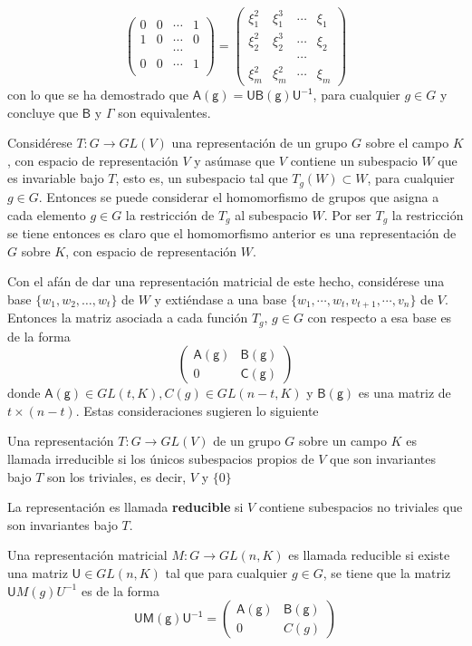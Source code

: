 \begin{ejemplo}
\[\begin{pmatrix}
0 & 0 & \cdots & 1 \\
1 & 0 & \cdots & 0 \\
 & & \cdots & \\
0 & 0 & \cdots & 1 \\
\end{pmatrix} = \begin{pmatrix}
\xi_1^2 & \xi_1^3 & \cdots & \xi_1 \\
\xi_2^2 & \xi_2^3 & \cdots & \xi_2 \\
 & & \cdots & \\
\xi_m^2 & \xi_m^2 & \cdots & \xi_m
\end{pmatrix}
\] con lo que se ha demostrado que $\mathsf{A(g)} = \mathsf{UB(g)U^{-1}}$, para cualquier $g \in G$ y concluye que $\mathsf{B}$ y $\mathsf{\Gamma}$ son equivalentes. 
\end{ejemplo}

Considérese $T \colon G \to GL(V)$ una representación de un grupo $G$ sobre el campo $K$, con espacio de representación $V$ y asúmase que $V$ contiene un subespacio $W$ que es invariable bajo $T$, esto es, un subespacio tal que $T_g(W) \subset W$, para cualquier $g \in G$. Entonces se puede considerar el homomorfismo de grupos que asigna a cada elemento $g \in G$ la restricción de $T_g$ al subespacio $W$. Por ser $T_g$ la restricción se tiene entonces es claro que el homomorfismo anterior es una representación de $G$ sobre $K$, con espacio de representación $W$.

Con el afán de dar una representación matricial de este hecho, considérese una base $\{ w_1, w_2, \dots, w_t \}$ de $W$ y extiéndase a una base $ \{ w_1, \cdots, w_t, v_{t+1}, \cdots, v_n \}$ de $V$. Entonces la matriz asociada a cada función $T_g$, $g \in G$ con respecto a esa base es de la forma
\[ \begin{pmatrix}
\mathsf{A(g)} & \mathsf{B(g)} \\
0 & \mathsf{C(g)}
\end{pmatrix} \] donde $\mathsf{A(g)} \in GL(t,K), C(g) \in GL(n-t,K)$ y $\mathsf{B(g)}$ es una matriz de $t \times (n-t)$. Estas consideraciones sugieren lo siguiente
\begin{definicion}
Una representación $T \colon G \to GL(V)$ de un grupo $G$ sobre un campo $K$ es llamada irreducible si los únicos subespacios propios de $V$ que son invariantes bajo $T$ son los triviales, es decir, $V$ y $\{ 0 \}$
\end{definicion}

La representación es llamada \textbf{reducible} si $V$ contiene  subespacios no triviales que son invariantes bajo $T$. 

\begin{definicion}
Una representación matricial $M \colon G \to GL(n,K)$ es llamada reducible si existe una matriz $\mathsf{U} \in GL(n,K)$ tal que para cualquier $g \in G$, se tiene que la matriz $\mathsf{U}M(g)U^{-1}$ es de la forma
\[  \mathsf{UM(g)U^{-1}} = \begin{pmatrix}
\mathsf{A(g)} & \mathsf{B(g)} \\
0 & C(g)
\end{pmatrix} \]
\end{definicion}